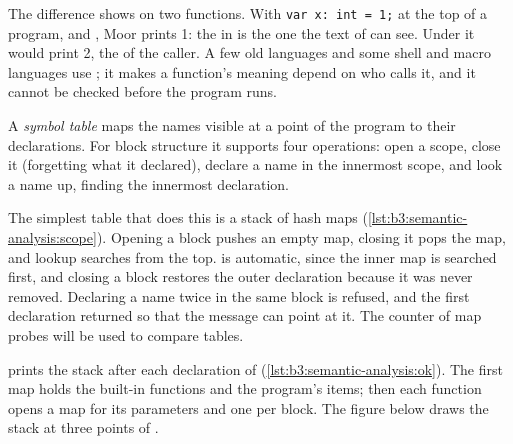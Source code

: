 The difference shows on two functions. With \texttt{var x:\ int = 1;} at the top of a program,  and , Moor prints 1: the  in  is the one the text of  can see. Under  it would print 2, the  of the caller. A few old languages and some shell and macro languages use ; it makes a function's meaning depend on who calls it, and it cannot be checked before the program runs.

\begin{definition}\label{def:b3:semantic-analysis:symbol-table}
A \emph{symbol table} maps the names visible at a point of the program to their declarations. For block structure it supports four operations: open a scope, close it (forgetting what it declared), declare a name in the innermost scope, and look a name up, finding the innermost declaration.
\end{definition}

The simplest table that does this is a stack of hash maps (\cref{lst:b3:semantic-analysis:scope}). Opening a block pushes an empty map, closing it pops the map, and lookup searches from the top.  is automatic, since the inner map is searched first, and closing a block restores the outer declaration because it was never removed. Declaring a name twice in the same block is refused, and the first declaration returned so that the message can point at it. The counter of map probes will be used to compare tables.

\label{lst:b3:semantic-analysis:scope}

 prints the stack after each declaration of  (\cref{lst:b3:semantic-analysis:ok}). The first map holds the built-in functions and the program's items; then each function opens a map for its parameters and one per block. The figure below draws the stack at three points of .

\label{lst:b3:semantic-analysis:ok}

